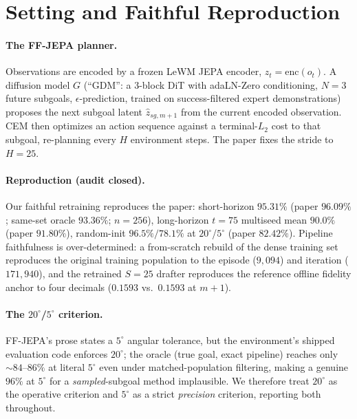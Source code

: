 \documentclass{article}
\newcommand{\degc}[1]{$#1^\circ$}
\begin{document}
\section{Setting and Faithful Reproduction}
\label{sec:repro}

\paragraph{The FF-JEPA planner.} Observations are encoded by a frozen LeWM JEPA encoder,
$z_t=\mathrm{enc}(o_t)$. A diffusion model $G$ (``GDM'': a 3-block DiT with adaLN-Zero
conditioning, $N{=}3$ future subgoals, $\epsilon$-prediction, trained on
success-filtered expert demonstrations) proposes the next subgoal latent
$\hat z_{sg,m+1}$ from the current encoded observation. CEM then optimizes an action
sequence against a terminal-$L_2$ cost to that subgoal, re-planning every $H$
environment steps. The paper fixes the stride to $H{=}25$.

\paragraph{Reproduction (audit closed).} Our faithful retraining reproduces the paper:
short-horizon $95.31\%$ (paper $96.09\%$; same-set oracle $93.36\%$; $n{=}256$),
long-horizon $t{=}75$ multiseed mean $90.0\%$ (paper $91.80\%$), random-init
$96.5\%/78.1\%$ at \degc{20}/\degc{5} (paper $82.42\%$). Pipeline faithfulness is
over-determined: a from-scratch rebuild of the dense training set reproduces the
original training population to the episode ($9{,}094$) and iteration ($171{,}940$),
and the retrained $S{=}25$ drafter reproduces the reference offline fidelity anchor to
four decimals ($0.1593$ vs.\ $0.1593$ at $m{+}1$).

\paragraph{The \degc{20}/\degc{5} criterion.} FF-JEPA's prose states a \degc{5} angular
tolerance, but the environment's shipped evaluation code enforces \degc{20}; the oracle
(true goal, exact pipeline) reaches only ${\sim}84$--$86\%$ at literal \degc{5} even
under matched-population filtering, making a genuine $96\%$ at \degc{5} for a
\emph{sampled}-subgoal method implausible. We therefore treat \degc{20} as the operative
criterion and \degc{5} as a strict \emph{precision} criterion, reporting both throughout.
\end{document}
